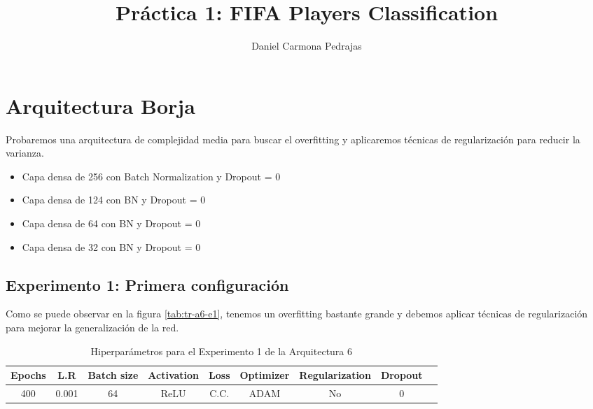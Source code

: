 \documentclass{article}
\begin{document}
\title{Pr\'actica 1: FIFA Players Classification}

\author{{Daniel Carmona Pedrajas}}

\date{}
\maketitle



		
    \section{Arquitectura Borja}
			Probaremos una arquitectura de complejidad media para buscar el overfitting y aplicaremos t\'ecnicas de regularizaci\'on para reducir la varianza. 
			\begin{itemize}
			    \item Capa densa de 256 con Batch Normalization y Dropout = 0
                \item Capa densa de 124 con BN y Dropout = 0
                \item Capa densa de 64 con BN y Dropout = 0
                \item Capa densa de 32 con BN y Dropout = 0
			\end{itemize}
		\subsection{Experimento 1: Primera configuraci\'on}
        \label{s-a6-e1}
            Como se puede observar en la figura \ref{tab:tr-a6-e1}, tenemos un overfitting bastante grande y debemos aplicar t\'ecnicas de regularizaci\'on para mejorar la generalizaci\'on de la red. 
            \begin{table}[!h]
				\begin{tabular}{|c|c|c|c|c|c|c|c|c|}
					\textbf{Epochs}&\textbf{L.R}&\textbf{Batch size}&\textbf{Activation}&\textbf{Loss}&\textbf{Optimizer}&\textbf{Regularization}&\textbf{Dropout}   \\ \hline
					400 & 0.001 & 64 & ReLU & C.C. & ADAM & No & 0 
				\end{tabular}
				\caption{Hiperpar\'ametros para el Experimento 1 de la Arquitectura 6}
				\label{tab:hip-a6-e1}
			\end{table}
   
\end{document}
